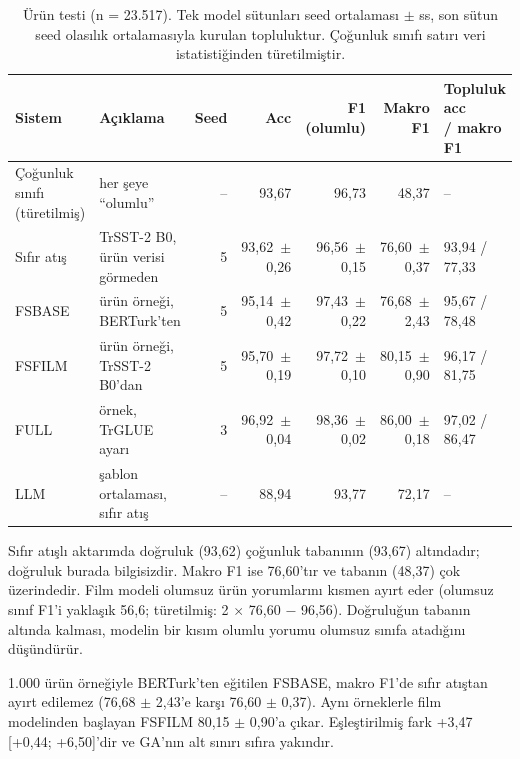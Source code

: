 \documentclass[11pt]{article}
\begin{document}
\begin{table}[!htbp]
\centering
\scriptsize
\setlength{\tabcolsep}{4pt}
\begin{tabularx}{\textwidth}{l>{\raggedright\arraybackslash}Xrrrrl}
\toprule
Sistem & Açıklama & Seed & Acc & F1 (olumlu) & Makro F1 & \makecell[l]{Topluluk acc \\ / makro F1} \\
\midrule
Çoğunluk sınıfı (türetilmiş) & her şeye ``olumlu'' & \mbox{–} & \mbox{93,67} & \mbox{96,73} & \mbox{48,37} & – \\
Sıfır atış & TrSST-2 B0, ürün verisi görmeden & \mbox{5} & \mbox{93,62 $\pm$ 0,26} & \mbox{96,56 $\pm$ 0,15} & \mbox{76,60 $\pm$ 0,37} & 93,94 / 77,33 \\
FSBASE & 1.000 ürün örneği, BERTurk'ten & \mbox{5} & \mbox{95,14 $\pm$ 0,42} & \mbox{97,43 $\pm$ 0,22} & \mbox{76,68 $\pm$ 2,43} & 95,67 / 78,48 \\
FSFILM & 1.000 ürün örneği, TrSST-2 B0'dan & \mbox{5} & \mbox{95,70 $\pm$ 0,19} & \mbox{97,72 $\pm$ 0,10} & \mbox{80,15 $\pm$ 0,90} & 96,17 / 81,75 \\
FULL & 188.132 örnek, TrGLUE ayarı & \mbox{3} & \mbox{96,92 $\pm$ 0,04} & \mbox{98,36 $\pm$ 0,02} & \mbox{86,00 $\pm$ 0,18} & 97,02 / 86,47 \\
LLM & 3 şablon ortalaması, sıfır atış & \mbox{–} & \mbox{88,94} & \mbox{93,77} & \mbox{72,17} & – \\
\bottomrule
\end{tabularx}
\caption{Ürün testi (n = 23.517). Tek model sütunları seed ortalaması $\pm$ ss, son sütun seed olasılık ortalamasıyla kurulan topluluktur. Çoğunluk sınıfı satırı veri istatistiğinden türetilmiştir.}
\label{tab:19}
\end{table}

Sıfır atışlı aktarımda doğruluk (93,62) çoğunluk tabanının (93,67) altındadır; doğruluk burada bilgisizdir. Makro F1 ise 76,60'tır ve tabanın (48,37) çok üzerindedir. Film modeli olumsuz ürün yorumlarını kısmen ayırt eder (olumsuz sınıf F1'i yaklaşık 56,6; türetilmiş: 2 $\times$ 76,60 $-$ 96,56). Doğruluğun tabanın altında kalması, modelin bir kısım olumlu yorumu olumsuz sınıfa atadığını düşündürür.

1.000 ürün örneğiyle BERTurk'ten eğitilen FSBASE, makro F1'de sıfır atıştan ayırt edilemez (76,68 $\pm$ 2,43'e karşı 76,60 $\pm$ 0,37). Aynı örneklerle film modelinden başlayan FSFILM 80,15 $\pm$ 0,90'a çıkar. Eşleştirilmiş fark +3,47 [+0,44; +6,50]'dir ve GA'nın alt sınırı sıfıra yakındır.
\end{document}
